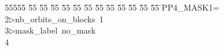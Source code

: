 %
%
\begin{tabbing}
55555 \= 55 \= 55 \= 55 \= 55 \= 55 \= 55 \= 55 \= 55 \= 55 \= 55 \= 55 \= 55 \= \>PP4\_MASK1=\\[0pt]
2\>$\triangleright$\>nb\_orbits\_on\_blocks\ 1\ \\[0pt]
3\>$\triangleright$\>mask\_label\ no\_mask\\[0pt]
4\>\end{tabbing}
